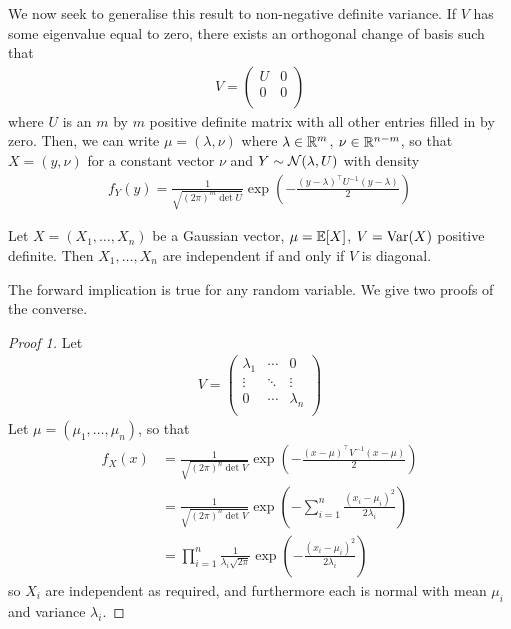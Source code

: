 \documentclass{../template/note}
\begin{document}
    We now seek to generalise this result to non-negative definite variance. If \(V\) has some eigenvalue equal to zero, there exists an orthogonal change of basis such that
    \begin{align*}
        V = \begin{pmatrix}
            U & 0 \\
            0 & 0 \\
        \end{pmatrix}
    \end{align*}
    where \(U\) is an \(m\) by \(m\) positive definite matrix with all other entries filled in by zero. Then, we can write \(\mu = (\lambda, \nu)\) where \(\lambda \in \mathbb R^m\), \(\nu \in \mathbb R^{n-m}\), so that \(X = (y, \nu)\) for a constant vector \(\nu\) and \(Y \sim \mathcal{N}(\lambda, U)\) with density
    \begin{align*}
        f_Y(y) = \frac 1{\sqrt{(2\pi)^m \det U}} \exp\left(-\frac{(y-\lambda)^\intercal U^{-1} (y-\lambda)} 2\right)
    \end{align*}
    
    \begin{proposition}
        Let \(X = (X_1, \dots, X_n)\) be a Gaussian vector, \(\mu = \mathbb E[X]\), \(V = \operatorname{Var}(X)\) positive definite. Then \(X_1, \dots, X_n\) are independent if and only if \(V\) is diagonal.
    \end{proposition}
    
    The forward implication is true for any random variable. We give two proofs of the converse.

    \begin{proof}[Proof 1]
        Let
        \begin{align*}
            V = \begin{pmatrix}
                \lambda_1 & \cdots & 0 \\
                \vdots & \ddots & \vdots \\
                0 & \cdots & \lambda_n \\
            \end{pmatrix}
        \end{align*}
        Let \(\mu = (\mu_1, \dots, \mu_n)\), so that
        \begin{align*}
            f_X(x) &= \frac 1{\sqrt{(2\pi)^n \det V}} \exp\left(-\frac{(x-\mu)^\intercal V^{-1} (x-\mu)}{2}\right) \\
            &= \frac 1{\sqrt{(2\pi)^n \det V}} \exp\left(-\sum_{i=1}^n \frac{(x_i-\mu_i)^2}{2\lambda_i}\right) \\
            &= \prod_{i=1}^n \frac 1 {\lambda_i \sqrt{2\pi}} \exp\left(-\frac{(x_i-\mu_i)^2}{2\lambda_i}\right)
        \end{align*}
        so \(X_i\) are independent as required, and furthermore each is normal with mean \(\mu_i\) and variance \(\lambda_i\).
    \end{proof}
    
\end{document}
